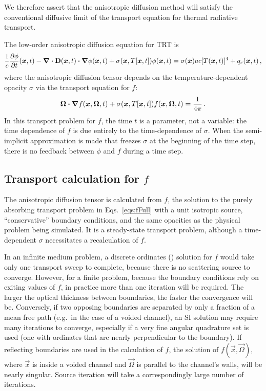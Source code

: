 We therefore assert that the anisotropic diffusion method will
satisfy the conventional diffusive limit of the transport equation for thermal
radiative transport.

The low-order anisotropic diffusion equation for TRT is
\begin{equation*}
\frac{1}{c} \frac{\partial \phi}{\partial t} (\bm{x}, t)
  - \bm{\nabla} \bm{\cdot} \mathbf{D}(\bm{x},t) \bm{\cdot} \bm{\nabla} \phi(\bm{x},t)
  + \sigma(\bm{x}, T[\bm{x}, t]) \phi(\bm{x}, t)
  = \sigma(\bm{x}) ac [T(\bm{x}, t)]^4 + q_{r}(\bm{x}, t)\,,
\end{equation*}
where the anisotropic diffusion tensor depends on the temperature-dependent
opacity $\sigma$ via the transport equation for $f$:
\begin{equation*}
  \bm{\Omega}\bm{\cdot} \bm{\nabla} f(\bm{x}, \bm{\Omega}, t)
  + \sigma(\bm{x},T[\bm{x},t]) f(\bm{x}, \bm{\Omega}, t)
  = \frac{1}{4\pi}\,.
\end{equation*}
In this transport problem for $f$, the time $t$ is a parameter, not a variable:
the time dependence of $f$ is due entirely to the time-dependence of $\sigma$.
When the semi-implicit approximation is made that freezes $\sigma$ at the
beginning of the time step, there is no feedback between $\phi$ and $f$ during a
time step.


\subsection{Transport calculation for \texorpdfstring{$f$}{f}}

The anisotropic diffusion tensor is calculated from $f$, the solution to the
purely absorbing transport problem in Eqs.~\eqref{eqs:fFull}  with a unit
isotropic source,
``conservative'' boundary conditions, and the same opacities as the physical problem
being simulated. It is a steady-state transport problem, although a
time-dependent $\sigma$ necessitates a recalculation of $f$.

In an infinite medium problem, a discrete ordinates (\SN)
solution for $f$ would take only one transport sweep to complete, because there
is no scattering source to converge. However, for a finite problem, because the boundary conditions
rely on exiting values of $f$, in practice more than one iteration will be
required. The
larger the optical thickness between boundaries, the faster the convergence will
be. Conversely, if
two opposing boundaries are separated by only a fraction of a mean free path
(e.g.\ in the case of a voided channel), an SI solution may require many
iterations to converge, especially if a very fine angular quadrature set is used
(one with ordinates that are nearly perpendicular to the boundary). If
reflecting boundaries are used in the calculation of $f$, the solution of
$f(\vec{x},\vec{\Omega})$, where $\vec{x}$ is inside a voided channel and
$\vec{\Omega}$ is parallel to the channel's walls, will be nearly singular.
Source iteration will take a correspondingly large number of iterations.

